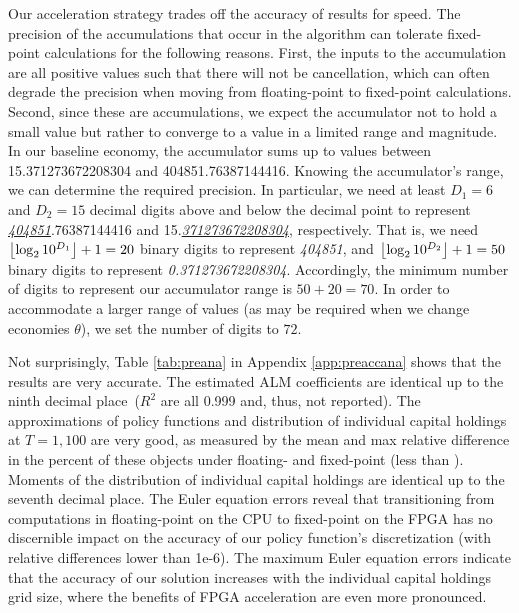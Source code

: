 \documentclass[12pt,american]{article}
\DeclarePairedDelimiter\floor{\lfloor}{\rfloor}
\newcommand{\resultsfolder}{./results}
\newcommand{\absmaxdifferencekprimekcross}{}
\newcommand{\fixedprecisonbits}{72}
\newcommand{\kprimecrossfloatVSfixdecimalplaces}{seventh decimal place}
\newcommand{\coeffsfloatVSfixdecimalplaces}{ninth decimal place}
\newcommand{\EEEfpgacpudifferences}{1e-6}
\begin{document}
Our acceleration strategy trades off the accuracy of results for speed. The precision of the accumulations that occur in the algorithm can tolerate fixed-point calculations for the following reasons. First, the inputs to the accumulation are all positive values such that there will not be cancellation, which can often degrade the precision when moving from floating-point to fixed-point calculations. Second, since these are accumulations, we expect the accumulator not to hold a small value but rather to converge to a value in a limited range and magnitude. In our baseline economy, the accumulator sums up to values between 15.371273672208304 and 404851.76387144416. Knowing the accumulator's range, we can determine the required precision. In particular, we need at least $D_1=6$ and $D_2=15$ decimal digits above and below the decimal point to represent \underline{\textit{404851}}.76387144416 and 15.\underline{\textit{371273672208304}}, respectively. That is, we need $\floor*{\log_{2} {10^{D_1}}}+1=20$ binary digits to represent \textit{404851}, and $\floor*{\log_{2} {10^{D_2}}}+1=50$ binary digits to represent \textit{0.371273672208304}. Accordingly, the minimum number of digits to represent our accumulator range is $50+20=70$. In order to accommodate a larger range of values (as may be required when we change economies $\theta$), we set the number of digits to $\fixedprecisonbits$. 

Not surprisingly, Table \ref{tab:preana} in Appendix \ref{app:preaccana} shows that the results are very accurate. The estimated ALM coefficients are identical up to the \coeffsfloatVSfixdecimalplaces\ ($R^2$ are all 0.999 and, thus, not reported). The approximations of policy functions and distribution of individual capital holdings at $T=1,100$ are very good, as measured by the mean and max relative difference in the percent of these objects under floating- and fixed-point (less than \absmaxdifferencekprimekcross\hspace{-0.1cm}). Moments of the distribution of individual capital holdings are identical up to the \kprimecrossfloatVSfixdecimalplaces. The Euler equation errors reveal that transitioning from computations in floating-point on the CPU to fixed-point on the FPGA has no discernible impact on the accuracy of our policy function's discretization (with relative differences lower than \EEEfpgacpudifferences). The maximum Euler equation errors indicate that the accuracy of our solution increases with the individual capital holdings grid size, where the benefits of FPGA acceleration are even more pronounced. 
\end{document}
